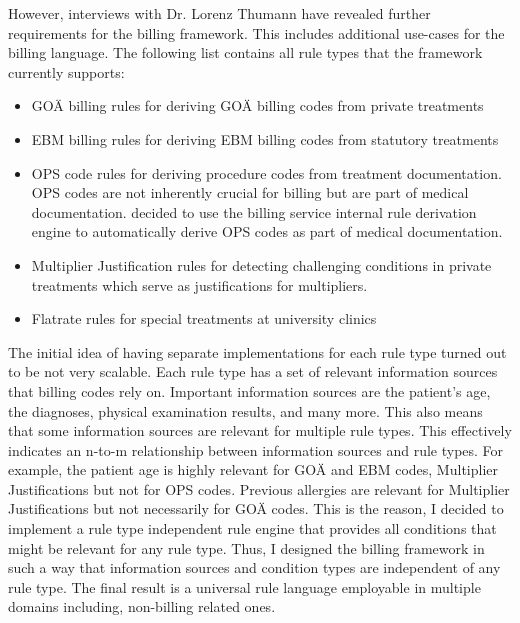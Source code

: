 However, interviews with Dr. Lorenz Thumann have revealed further requirements for the billing framework.
This includes additional use-cases for the billing language.
The following list contains all rule types that the framework currently supports:
\begin{itemize}
    \item GOÄ billing rules for deriving GOÄ billing codes from private treatments
    \item EBM billing rules for deriving EBM billing codes from statutory treatments
    \item OPS code rules for deriving procedure codes from treatment documentation.
    OPS codes are not inherently crucial for billing but are part of medical documentation.
    \AV decided to use the billing service internal rule derivation engine to automatically derive OPS codes as part of medical documentation.
    \item Multiplier Justification rules for detecting challenging conditions in private treatments
    which serve as justifications for multipliers.
    \item Flatrate rules for special treatments at university clinics
\end{itemize}


The initial idea of having separate implementations for each rule type turned out to be not very scalable.
Each rule type has a set of relevant information sources that billing codes rely on.
Important information sources are the patient's age, the diagnoses, physical examination results, and many more.
This also means that some information sources are relevant for multiple rule types.
This effectively indicates an n-to-m relationship between information sources and rule types.
For example, the patient age is highly relevant for GOÄ and EBM codes, Multiplier Justifications but not for OPS codes.
Previous allergies are relevant for Multiplier Justifications but not necessarily for GOÄ codes.
This is the reason, I decided to implement a rule type independent rule engine that provides all conditions that might be relevant for any rule type.
Thus, I designed the billing framework in such a way that information sources and condition types are independent of any rule type.
The final result is a universal rule language employable in multiple domains including, non-billing related ones.

